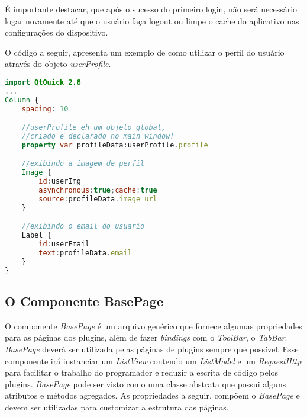 É importante destacar, que após o sucesso do primeiro login, não será necessário logar novamente até que o usuário faça logout ou limpe o cache do aplicativo nas configurações do dispositivo.\par

O código a seguir, apresenta um exemplo de como utilizar o perfil do usuário através do objeto \textit{userProfile}.

\begin{center}
\begin{lstlisting}[language=qml]
import QtQuick 2.8
...
Column {
	spacing: 10

	//userProfile eh um objeto global,
	//criado e declarado no main window!
	property var profileData:userProfile.profile

	//exibindo a imagem de perfil
	Image {
		id:userImg
		asynchronous:true;cache:true
		source:profileData.image_url
	}

	//exibindo o email do usuario
	Label {
		id:userEmail
		text:profileData.email
	}
}
\end{lstlisting}
\end{center}


\subsection{O Componente BasePage}\label{sec:solucao-desenvolvida}
O componente \textit{BasePage} é um arquivo genérico que fornece algumas propriedades para as páginas dos plugins, além de fazer \textit{bindings} com o \textit{ToolBar}, o \textit{TabBar}. \textit{BasePage} deverá ser utilizada pelas páginas de plugins sempre que possível. Esse componente irá instanciar um \textit{ListView} contendo um \textit{ListModel} e um \textit{RequestHttp} para facilitar o trabalho do programador e reduzir a escrita de código pelos plugins. \textit{BasePage} pode ser visto como uma classe abstrata que possui alguns atributos e métodos agregados. As propriedades a seguir, compõem o \textit{BasePage} e devem ser utilizadas para customizar a estrutura das páginas.

